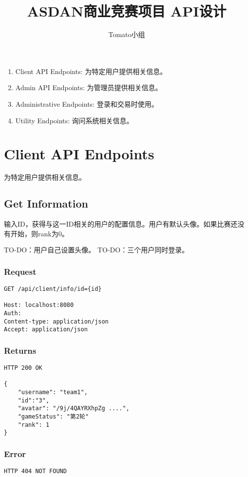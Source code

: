 \documentclass{article}
\title{ASDAN商业竞赛项目 API设计}
\author{Tomato小组}
\begin{document}
\maketitle

\tableofcontents

\newpage

\begin{enumerate}
	\item Client API Endpoints: 为特定用户提供相关信息。
	\item Admin API Endpoints: 为管理员提供相关信息。
	\item Administrative Endpoints: 登录和交易时使用。
	\item Utility Endpoints: 询问系统相关信息。
\end{enumerate}

\section{Client API Endpoints}

为特定用户提供相关信息。

\subsection{Get Information}
输入ID，获得与这一ID相关的用户的配置信息。用户有默认头像。如果比赛还没有开始，则rank为0。

TO-DO：用户自己设置头像。
TO-DO：三个用户同时登录。

\subsubsection*{Request}
\begin{lstlisting}
GET /api/client/info/id={id}

Host: localhost:8080
Auth:
Content-type: application/json
Accept: application/json
\end{lstlisting}
\subsubsection*{Returns}
\begin{lstlisting}
HTTP 200 OK

{
    "username": "team1",
    "id":"3",
    "avatar": "/9j/4QAYRXhpZg ....",
    "gameStatus": "第2轮"
    "rank": 1
}
\end{lstlisting}
\subsubsection*{Error}
\begin{lstlisting}
HTTP 404 NOT FOUND
\end{lstlisting}
\end{document}
